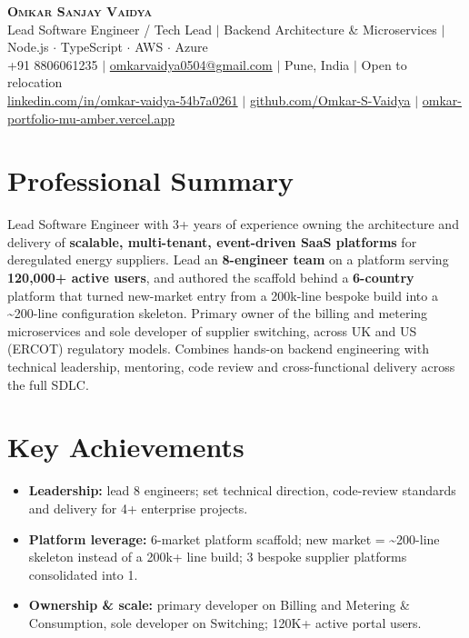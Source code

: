 \documentclass[letterpaper,11pt]{article}
\newcommand{\resumeItem}[1]{\item\small{{#1 \vspace{-2pt}}}}
\newcommand{\resumeSubItem}[1]{\resumeItem{#1}\vspace{-2pt}}
\newcommand{\resumeSubHeadingListStart}{\begin{itemize}[leftmargin=0.15in, label={}]}
\newcommand{\resumeSubHeadingListEnd}{\end{itemize}}
\begin{document}
\begin{center}
\textbf{\Huge \scshape Omkar Sanjay Vaidya} \\ \vspace{2pt}
\large Lead Software Engineer / Tech Lead $|$ Backend Architecture \& Microservices $|$ Node.js $\cdot$ TypeScript $\cdot$ AWS $\cdot$ Azure \\ \vspace{2pt}
\small +91 8806061235 $|$
\href{mailto:omkarvaidya0504@gmail.com}{omkarvaidya0504@gmail.com} $|$
Pune, India $|$ Open to relocation \\
\href{https://www.linkedin.com/in/omkar-vaidya-54b7a0261/}{linkedin.com/in/omkar-vaidya-54b7a0261} $|$
\href{https://github.com/Omkar-S-Vaidya}{github.com/Omkar-S-Vaidya} $|$
\href{https://omkar-portfolio-mu-amber.vercel.app/}{omkar-portfolio-mu-amber.vercel.app}
\end{center}

\section{Professional Summary}
\small{Lead Software Engineer with 3+ years of experience owning the architecture and delivery of \textbf{scalable, multi-tenant, event-driven SaaS platforms} for deregulated energy suppliers. Lead an \textbf{8-engineer team} on a platform serving \textbf{120,000+ active users}, and authored the scaffold behind a \textbf{6-country} platform that turned new-market entry from a 200k-line bespoke build into a \textasciitilde200-line configuration skeleton. Primary owner of the billing and metering microservices and sole developer of supplier switching, across UK and US (ERCOT) regulatory models. Combines hands-on backend engineering with technical leadership, mentoring, code review and cross-functional delivery across the full SDLC.}

\section{Key Achievements}
\resumeSubHeadingListStart
\resumeSubItem{\textbf{Leadership:} lead 8 engineers; set technical direction, code-review standards and delivery for 4+ enterprise projects.}
\resumeSubItem{\textbf{Platform leverage:} 6-market platform scaffold; new market = \textasciitilde200-line skeleton instead of a 200k+ line build; 3 bespoke supplier platforms consolidated into 1.}
\resumeSubItem{\textbf{Ownership \& scale:} primary developer on Billing and Metering \& Consumption, sole developer on Switching; 120K+ active portal users.}
\resumeSubHeadingListEnd
\end{document}

